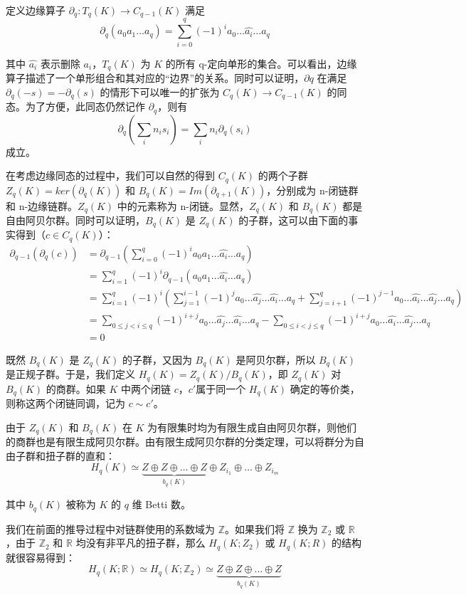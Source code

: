 定义边缘算子 $ \partial_q: T_q(K) \to C_{q-1}(K) $ 满足 
$$ \partial_q (a_0 a_1 \dots a_q) = \sum_{i=0}^{q} (-1)^i a_0 \dots \hat{a_i} \dots a_q $$

其中  $ \hat{a_i} $ 表示删除 $ a_i $，$ T_q(K) $ 为 $ K $ 的所有 q-定向单形的集合。可以看出，边缘算子描述了一个单形组合和其对应的“边界”的关系。同时可以证明，$ \partial q $ 在满足 $\partial_q(-s) = -\partial_q(s) $ 的情形下可以唯一的扩张为 $ C_q(K) \to C_{q-1}(K) $ 的同态。为了方便，此同态仍然记作 $ \partial_q $，则有
$$
\partial_q (\sum_i n_i s_i) = \sum_i n_i \partial_q (s_i)
$$
成立。

在考虑边缘同态的过程中，我们可以自然的得到 $ C_q(K) $ 的两个子群 $ Z_q(K) = ker(\partial_q(K)) $ 和 $ B_q(K) = Im(\partial_{q+1}(K)) $，分别成为 n-闭链群和 n-边缘链群。$ Z_q(K) $ 中的元素称为 n-闭链。显然，$ Z_q(K) $ 和 $ B_q(K) $ 都是自由阿贝尔群。同时可以证明，$ B_q(K) $ 是 $ Z_q(K) $ 的子群，这可以由下面的事实得到（$ c \in C_q(K) $）：
\begin{align*}
\partial_{q-1} (\partial_q (c)) &= \partial_{q-1} (\sum_{i=0}^q (-1)^i a_0 a_1 \dots \hat{a_i} \dots a_q) \\
&= \sum_{i=1}^q (-1)^i \partial_{q-1} (a_0 a_1 \dots \hat{a_i} \dots a_q) \\
&= \sum_{i=1}^q (-1)^i ( \sum_{j=1}^{i-1} (-1)^j a_0 \dots \hat{a_j} \dots \hat{a_i} \dots a_q + \sum_{j=i+1}^{q} (-1)^{j-1} a_0 \dots \hat{a_i} \dots \hat{a_j} \dots a_q ) \\
&= \sum_{0 \le j < i \le q} (-1)^{i+j} a_0 \dots \hat{a_j} \dots \hat{a_i} \dots a_q - \sum_{0 \le i < j \le q} (-1)^{i+j} a_0 \dots \hat{a_i} \dots \hat{a_j} \dots a_q \\
&= 0
\end{align*}

既然 $ B_q(K) $ 是 $ Z_q(K) $ 的子群，又因为 $ B_q(K) $ 是阿贝尔群，所以 $ B_q(K) $ 是正规子群。于是，我们定义 $ H_q(K) = Z_q(K) / B_q(K) $，即 $ Z_q(K) $ 对 $ B_q(K) $ 的商群。如果 $ K $ 中两个闭链 $ c $，$ c' $属于同一个 $ H_q(K) $ 确定的等价类，则称这两个闭链同调，记为 $ c \sim c' $。

由于 $ Z_q(K) $ 和 $ B_q(K) $ 在 $ K $ 为有限集时均为有限生成自由阿贝尔群，则他们的商群也是有限生成阿贝尔群。由有限生成阿贝尔群的分类定理，可以将群分为自由子群和扭子群的直和：
$$
H_q(K) \simeq \underbrace{Z \oplus Z \oplus \dots \oplus Z}_{b_q(K)} \oplus Z_{i_1} \oplus \dots \oplus Z_{i_m}
$$

其中 $ b_q(K) $ 被称为 $ K $ 的 $ q $ 维 Betti 数。

我们在前面的推导过程中对链群使用的系数域为 $ \mathbb Z $。如果我们将 $ \mathbb{Z} $ 换为 $ \mathbb{Z}_2 $ 或 $ \mathbb{R} $，由于 $ \mathbb{Z}_2 $ 和 $ \mathbb{R} $ 均没有非平凡的扭子群，那么 $ H_q(K; Z_2) $ 或 $ H_q(K; R) $ 的结构就很容易得到：
$$
H_q(K;\mathbb{R}) \simeq H_q(K;\mathbb{Z}_2) \simeq\underbrace{Z \oplus Z \oplus \dots \oplus Z}_{b_q(K)}
$$

